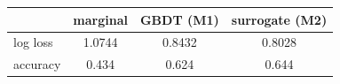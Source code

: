 \begin{tabular}{lccc}
\toprule
 & marginal & GBDT (M1) & surrogate (M2) \\
\midrule
log loss & 1.0744 & 0.8432 & 0.8028 \\
accuracy & 0.434 & 0.624 & 0.644 \\
\bottomrule
\end{tabular}
